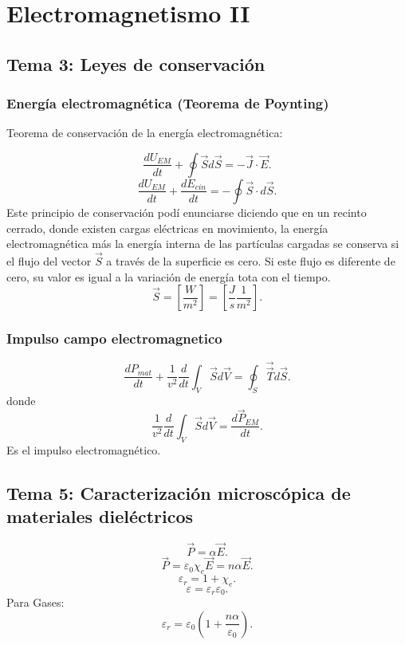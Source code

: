 \chapter{Electromagnetismo II}
\section{Tema 3: Leyes de conservación}
\subsection{Energía electromagnética (Teorema de Poynting)}
Teorema de conservación de la energía electromagnética:

\[
\frac{dU_{EM}}{dt}+ \oint \vec{S}d\vec{S}= -\vec{J}\cdot \vec{E}
.\] 
\[
\frac{d U_{EM}}{dt}+ \frac{dE_{cin}}{dt} = - \oint \vec{S}\cdot d\vec{S}
.\] 
Este principio de conservación podí enunciarse diciendo que en un recinto cerrado, donde existen cargas eléctricas en movimiento, la energía electromagnética más la energía interna de las partículas cargadas se conserva si el flujo del vector $\vec{S}$ a través de la superficie es cero. Si este flujo es diferente de cero, su valor es igual a la variación de energía tota con el tiempo. 
\[
    \vec{S}=[\frac{W}{m^2}]= [\frac{J}{s} \frac{1}{m^2}]
.\] 
\subsection{Impulso campo electromagnetico}
\[
    \frac{dP_{mat}}{dt} + \frac{1}{v^2} \frac{d}{dt} \int_V \vec{S}d\vec{V}= \oint_S \vec{\vec{T}}d\vec{S}
.\] 
donde \[
\frac{1}{v^2}\frac{d}{dt} \int_V \vec{S}d\vec{V}= \frac{d\vec{P}_{EM}}{dt}
.\] 
Es el impulso electromagnético.
\section{Tema 5: Caracterización microscópica de materiales dieléctricos}
        \begin{tcolorbox}[enhanced,attach boxed title to top center={yshift=-3mm,yshifttext=-1mm},
              colback=blue!5!white,colframe=blue!75!black,colbacktitle=blue!80!black,
              title=Relaciones iniciales,fonttitle=\bfseries,
                  boxed title style={size=small,colframe=blue!50!black} ]
              \[
                  \vec{P}= \alpha \vec{E}
              .\]     
              \[
                  \vec{P}= \varepsilon_0 \chi_e \vec{E}= n\alpha \vec{E}
              .\] 
              \[
              \varepsilon_r=1+ \chi_e
              .\] 
             \[
             \varepsilon=\varepsilon_r\varepsilon_0
             .\]  
              Para Gases: \[
                  \varepsilon_r=\varepsilon_0\left( 1+ \frac{n\alpha}{\varepsilon_0} \right) 
              .\] 
\end{tcolorbox}


